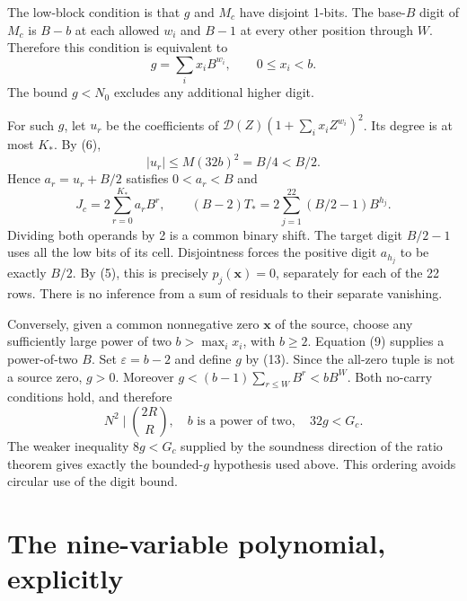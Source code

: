 \documentclass[11pt]{article}
\theoremstyle{definition}\newtheorem{definition}[theorem]{Definition}
\begin{document}
The low-block condition is that $g$ and $M_c$ have disjoint 1-bits.
The base-$B$ digit of $M_c$ is $B-b$ at each allowed $w_i$ and $B-1$
at every other position through $W$. Therefore this condition is
equivalent to
\[
 g=\sum_i x_iB^{w_i},\qquad0\leq x_i<b.
 \tag{13}
\]
The bound $g<N_0$ excludes any additional higher digit.

For such $g$, let $u_r$ be the coefficients of
$\mathcal D(Z)(1+\sum_i x_iZ^{w_i})^2$. Its degree is at most $K_*$.
By (6),
\[
 |u_r|\leq M(32b)^2=B/4<B/2.
\]
Hence $a_r=u_r+B/2$ satisfies $0<a_r<B$ and
\[
 J_c=2\sum_{r=0}^{K_*}a_rB^r,
 \qquad (B-2)T_*=2\sum_{j=1}^{22}(B/2-1)B^{h_j}.
\]
Dividing both operands by 2 is a common binary shift. The target digit
$B/2-1$ uses all the low bits of its cell. Disjointness forces the positive
digit $a_{h_j}$ to be exactly $B/2$. By (5), this is precisely
$p_j(\boldsymbol x)=0$, separately for each of the 22 rows.
There is no inference from a sum of residuals to their separate vanishing.

Conversely, given a common nonnegative zero $\boldsymbol x$ of the source,
choose any sufficiently large power of two $b>\max_i x_i$, with $b\geq2$.
Equation (9) supplies a power-of-two $B$. Set
$\varepsilon=b-2$ and define $g$ by (13). Since the all-zero tuple is not
a source zero, $g>0$. Moreover $g<(b-1)\sum_{r\leq W}B^r<bB^W$.
Both no-carry conditions hold, and therefore
\[
 N^2\mid\binom{2R}{R},\quad b\text{ is a power of two},\quad
 32g<G_c.                                             \tag{14}
\]
The weaker inequality $8g<G_c$ supplied by the soundness direction of
the ratio theorem gives exactly the bounded-$g$ hypothesis used above.
This ordering avoids circular use of the digit bound.

\section{The nine-variable polynomial, explicitly}
\label{sec:equation}
\end{document}
